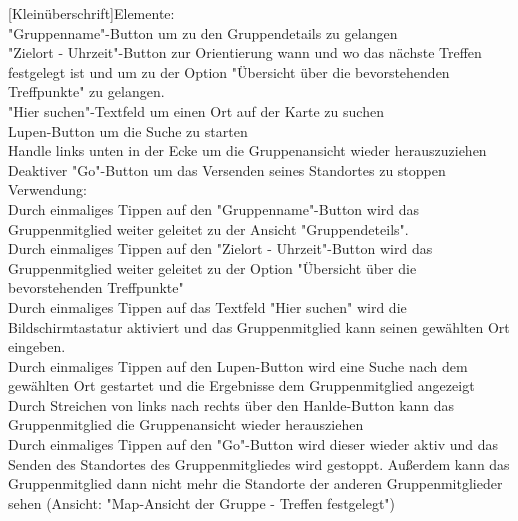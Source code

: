 [Kleinüberschrift]Elemente:\\
"Gruppenname"-Button um zu den Gruppendetails zu gelangen\\
"Zielort - Uhrzeit"-Button zur Orientierung wann und wo das nächste Treffen festgelegt ist und um zu der Option "Übersicht über die bevorstehenden Treffpunkte" zu gelangen.\\
"Hier suchen"-Textfeld um einen Ort auf der Karte zu suchen\\
Lupen-Button um die Suche zu starten\\
Handle links unten in der Ecke um die Gruppenansicht wieder herauszuziehen\\
Deaktiver "Go"-Button um das Versenden seines Standortes zu stoppen\\
[Kleinüberschrift]Verwendung:\\
Durch einmaliges Tippen auf den "Gruppenname"-Button wird das Gruppenmitglied weiter geleitet zu der Ansicht "Gruppendeteils".\\
Durch einmaliges Tippen auf den "Zielort - Uhrzeit"-Button wird das Gruppenmitglied weiter geleitet zu der Option "Übersicht über die bevorstehenden Treffpunkte"\\
Durch einmaliges Tippen auf das Textfeld "Hier suchen" wird die Bildschirmtastatur aktiviert und das Gruppenmitglied kann seinen gewählten Ort eingeben.\\
Durch einmaliges Tippen auf den Lupen-Button wird eine Suche nach dem gewählten Ort gestartet und die Ergebnisse dem Gruppenmitglied angezeigt\\
Durch Streichen von links nach rechts über den Hanlde-Button kann das Gruppenmitglied die Gruppenansicht wieder herausziehen\\
Durch einmaliges Tippen auf den "Go"-Button wird dieser wieder aktiv und das Senden des Standortes des Gruppenmitgliedes wird gestoppt. Außerdem kann das Gruppenmitglied dann nicht mehr die Standorte der anderen Gruppenmitglieder sehen (Ansicht: "Map-Ansicht der Gruppe - Treffen festgelegt")\\ \\